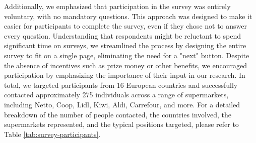 Additionally, we emphasized that participation in the survey was entirely voluntary, with no mandatory questions. This approach was designed to make it easier for participants to complete the survey, even if they chose not to answer every question. Understanding that respondents might be reluctant to spend significant time on surveys, we streamlined the process by designing the entire survey to fit on a single page, eliminating the need for a "next" button. Despite the absence of incentives such as prize money or other benefits, we encouraged participation by emphasizing the importance of their input in our research. In total, we targeted participants from 16 European countries and successfully contacted approximately 275 individuals across a range of supermarkets, including Netto, Coop, Lidl, Kiwi, Aldi, Carrefour, and more. For a detailed breakdown of the number of people contacted, the countries involved, the supermarkets represented, and the typical positions targeted, please refer to Table \ref{tab:survey-participants}.



